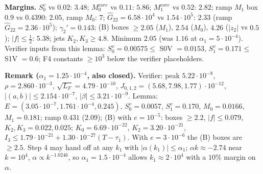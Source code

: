 \documentclass[11pt]{article}
\begin{document}
\noindent\textbf{Margins.} $S_0^v$ vs $0.02$: $3.48$; $M_0^{core}$ vs $0.11$: $5.86$; $M_1^{core}$ vs $0.52$: $2.82$; ramp $M_1$ box $0.9$ vs $0.4390$: $\mathbf{2.05}$, ramp $M_0$: $7$; $\hat G_{22}=6.58\cdot10^4$ vs $1.54\cdot10^5$: $2.33$ (ramp $\hat G_{22}=2.36\cdot10^5$); $\gamma_2'=0.143$; (B) boxes $\ge2.05$ ($M_1$), $2.54$ ($M_0$), $4.26$ ($|z_2|$ vs $0.5$); $|f|\le\tfrac12$: $5.38$; jets $K_2,K_3\ge4.8$. Minimum $2.05$ (was $1.16$ at $\alpha_1=5\cdot10^{-4}$). Verifier inputs from this lemma: $S_0^v=0.00575\le$ S0V $=0.0153$, $S_1^v=0.171\le$ S1V $=0.6$; F4 constants $\ge10^3$ below the verifier placeholders.

\noindent\textbf{Remark ($\alpha_1=1.25\cdot10^{-4}$, also closed).} Verifier: peak $5.22\cdot10^{-8}$, $\rho=2.860\cdot10^{-3}$, $\sqrt{L_F}=4.79\cdot10^{-10}$, $J_{0,1,2}=(5.68,7.98,1.77)\cdot10^{-12}$, $|(a,b)|\le2.154\cdot10^{-7}$, $|\beta|\le3.21\cdot10^{-9}$. Lemma: $E=(3.05\cdot10^{-7},1.761\cdot10^{-4},0.245)$, $S_0^v=0.0057$, $S_1^v=0.170$, $M_0=0.0166$, $M_1=0.181$; ramp $0.431$ ($2.09$); (B) with $e=10^{-5}$: boxes $\ge2.2$, $|f|\le0.079$, $K_2,K_3=0.022,0.025$; $K_0=6.69\cdot10^{-22}$, $K_2=3.20\cdot10^{-21}$, $I_3\le1.79\cdot10^{-21}+1.30\cdot10^{-27}(T-\tau_1)$. With $e=3\cdot10^{-6}$ the (B) boxes are $\ge2.5$. Step 4 may hand off at any $k_1$ with $|\alpha(k_1)|\le\alpha_1$; $\alpha k\approx-2.74$ near $k=10^4$, $\alpha\propto k^{-1.0246}$, so $\alpha_1=1.5\cdot10^{-4}$ allows $k_1\approx2\cdot10^4$ with a $10\%$ margin on $\alpha$.
\end{document}
